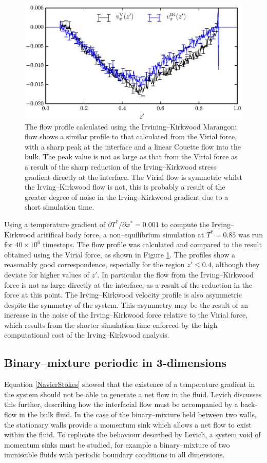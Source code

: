\begin{figure}[h]
\centering
\includegraphics[scale=0.8]{PisIKFlow}
\caption{The flow profile calculated using the Irvining--Kirkwood Marangoni flow shows a similar profile to that calculated from the Virial force, with a sharp peak at the interface and a linear Couette flow into the bulk.
The peak value is not as large as that from the Virial force as a result of the sharp reduction of the Irving--Kirkwood stress gradient directly at the interface.
The Virial flow is symmetric whilst the Irving--Kirkwood flow is not, this is probably a result of the greater degree of noise in the Irving--Kirkwood gradient due to a short simulation time.}
\label{PisIKFlow}
\end{figure}
Using a temperature gradient of $\partial T^{*} / \partial x^{*} = 0.001$ to compute the Irving--Kirkwood aritifical body force, a non--equilibrium simulation at $T^{*} = 0.85$ was run for $40 \times 10^{6}$ timesteps.
The flow profile was calculated and compared to the result obtained using the Virial force, as shown in Figure \ref{PisIKFlow}.
The profiles show a reasonably good correspondence, especially for the region $z' \leq 0.4$, although they deviate for higher values of $z'$.
In particular the flow from the Irving--Kirkwood force is not as large directly at the interface, as a result of the reduction in the force at this point.
The Irving--Kirkwood velocity profile is also asymmetric despite the symmetry of the system.
This asymmetry may be the result of an increase in the noise of the Irving--Kirkwood force relative to the Virial force, which results from the shorter simulation time enforced by the high computational cost of the Irving--Kirkwood analysis.

\FloatBarrier
\subsection{Binary--mixture periodic in 3-dimensions}
Equation \ref{NavierStokes} showed that the existence of a temperature gradient in the system should not be able to generate a net flow in the fluid. 
Levich discusses this further, describing how the interfacial flow must be accompanied by a back-flow in the bulk fluid.\cite{Levich}
In the case of the binary--mixture held between two walls, the stationary walls provide a momentum sink which allows a net flow to exist within the fluid.
To replicate the behaviour described by Levich, a system void of momentum sinks must be studied, for example a binary--mixture of two immiscible fluids with periodic boundary conditions in all dimensions.

